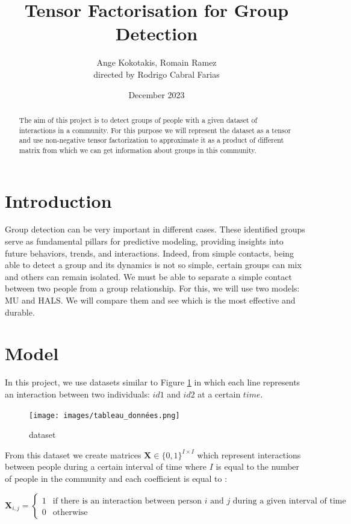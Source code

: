 \documentclass{article}
\title{Tensor Factorisation for Group Detection}
\author{ Ange Kokotakis, Romain Ramez \\ \small directed by Rodrigo Cabral Farias}
\date{December 2023}
\begin{document}
\maketitle

\begin{abstract}
    The aim of this project is to detect groups of people with a given dataset of interactions in a community.
    For this purpose we will represent the dataset as a tensor and use non-negative tensor factorization to approximate
    it as a product of different matrix from which we can get information about groups in this community.
\end{abstract}

\section{Introduction}

Group detection can be very important in different cases. These identified groups serve as fundamental pillars for predictive modeling, providing insights into future behaviors, trends, and interactions.
Indeed, from simple contacts, being able to detect a group and its dynamics is not so simple, certain groups can mix and others can remain isolated. We must be able to separate a simple contact between two people from a group relationship.
For this, we will use two models: MU and HALS.
We will compare them and see which is the most effective and durable.

\section{Model}

In this project, we use datasets similar to Figure \ref{dataset} in which each line represents an interaction between
two individuals: $id1$ and $id2$ at a certain $time$.

\begin{figure}[H]
    \centering
    \texttt{[image: images/tableau\_données.png]}
    \caption{dataset}
    \label{dataset}
\end{figure}

From this dataset we create matrices $\mathbf{X} \in \{0, 1\}^{I \times I}$ which represent interactions between people during a certain
interval of time where $I$ is equal to the number of people in the community and each coefficient is equal to :

\[
    \mathbf{X}_{i,j} = 
    \begin{cases}
        1 & \text{if there is an interaction between person $i$ and $j$ during a given interval of time} \\
        0 & \text{otherwise}
    \end{cases}
\]
\end{document}
